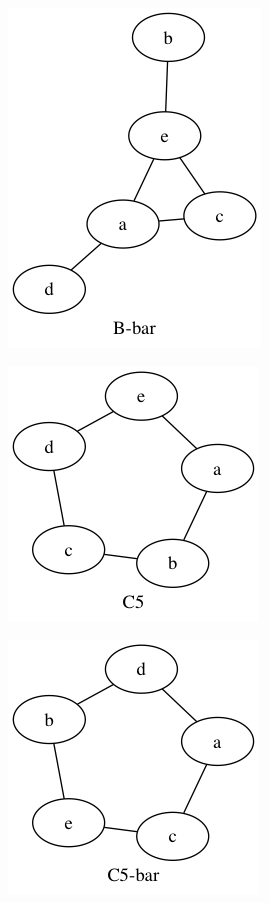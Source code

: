 \begin{enumerate}[(a)]
        \begin{figure}[H]
        \centering
        \includegraphics[scale=0.5]{118/2i.png}
        \end{figure}

        \begin{figure}[H]
        \centering
        \includegraphics[scale=0.5]{118/3.png}
        \end{figure}

        \begin{figure}[H]
        \centering
        \includegraphics[scale=0.5]{118/3i.png}
        \end{figure}


\end{enumerate}
